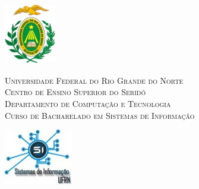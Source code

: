 
\begin{titlepage}
	\begin{center}
		
		\begin{minipage}{2.3cm}
			\begin{center}
				\includegraphics[width=2.25cm, height=2.68cm]{Imagens/Brasao-UFRN.jpg}
			\end{center}
		\end{minipage}
		\begin{minipage}{11.15cm}
			\begin{center}
				\begin{espacosimples}
					{\small 
                       \textsc{Universidade Federal do Rio Grande do Norte}		   			\\
							  \textsc{Centro de Ensino Superior do Seridó}					\\
							  \textsc{Departamento de Computação e Tecnologia}	   	\\
							  \textsc{Curso de Bacharelado em Sistemas de Informação} } 
	\end{espacosimples}
			\end{center}
		\end{minipage}
		\begin{minipage}{2.3cm}
			\begin{center}
				\includegraphics[width=3cm]{Imagens/bsi}
			\end{center}
		\end{minipage}
			
		\vspace{6cm}
						

\end{center}
\end{titlepage}
